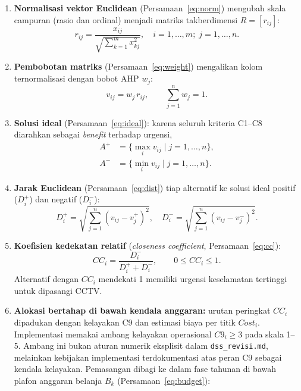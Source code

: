 \documentclass[10pt,twocolumn,a4paper]{article}
\newcommand{\cost}{\mathit{Cost}}
\begin{document}
\begin{enumerate}[label=\arabic*)]
\item \textbf{Normalisasi vektor Euclidean} (Persamaan~\eqref{eq:norm}) mengubah skala campuran (rasio dan ordinal) menjadi matriks takberdimensi $R=[r_{ij}]$:
\begin{equation}
r_{ij}=\frac{x_{ij}}{\sqrt{\sum_{k=1}^{m}x_{kj}^{2}}},\quad i=1,\dots,m;\; j=1,\dots,n.\label{eq:norm}
\end{equation}
\item \textbf{Pembobotan matriks} (Persamaan~\eqref{eq:weight}) mengalikan kolom ternormalisasi dengan bobot AHP $w_j$:
\begin{equation}
v_{ij}=w_j\, r_{ij},\qquad \sum_{j=1}^{n}w_j=1.\label{eq:weight}
\end{equation}
\item \textbf{Solusi ideal} (Persamaan~\eqref{eq:ideal}): karena seluruh kriteria C1--C8 diarahkan sebagai \textit{benefit} terhadap urgensi,
\begin{equation}
\begin{aligned}
A^{+}&=\{\max_i v_{ij}\mid j=1,\dots,n\},\\
A^{-}&=\{\min_i v_{ij}\mid j=1,\dots,n\}.
\end{aligned}\label{eq:ideal}
\end{equation}
\item \textbf{Jarak Euclidean} (Persamaan~\eqref{eq:dist}) tiap alternatif ke solusi ideal positif ($D_i^{+}$) dan negatif ($D_i^{-}$):
\begin{equation}
D_i^{+}=\sqrt{\sum_{j=1}^{n}(v_{ij}-v_j^{+})^{2}},\quad D_i^{-}=\sqrt{\sum_{j=1}^{n}(v_{ij}-v_j^{-})^{2}}.\label{eq:dist}
\end{equation}
\item \textbf{Koefisien kedekatan relatif} (\textit{closeness coefficient}, Persamaan~\eqref{eq:cc}):
\begin{equation}
\mathit{CC}_i=\frac{D_i^{-}}{D_i^{+}+D_i^{-}},\qquad 0\le \mathit{CC}_i\le 1.\label{eq:cc}
\end{equation}
Alternatif dengan $\mathit{CC}_i$ mendekati 1 memiliki urgensi keselamatan tertinggi untuk dipasangi CCTV.
\item \textbf{Alokasi bertahap di bawah kendala anggaran:} urutan peringkat $\mathit{CC}_i$ dipadukan dengan kelayakan C9 dan estimasi biaya per titik $\cost_i$. Implementasi memakai ambang kelayakan operasional $C9_i\ge3$ pada skala 1--5. Ambang ini bukan aturan numerik eksplisit dalam \texttt{dss\_revisi.md}, melainkan kebijakan implementasi terdokumentasi atas peran C9 sebagai kendala kelayakan. Pemasangan dibagi ke dalam fase tahunan di bawah plafon anggaran belanja $B_k$ (Persamaan~\eqref{eq:budget}):

\end{enumerate}
\end{document}
